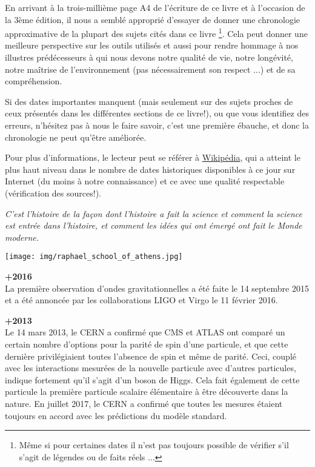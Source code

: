 En arrivant à la trois-millième page A4 de l'écriture de ce livre et à l'occasion de la 3ème édition, il nous a semblé approprié d'essayer de donner une chronologie approximative de la plupart des sujets cités dans ce livre \footnote{Même si pour certaines dates il n'est pas toujours possible de vérifier s'il s'agit de légendes ou de faits réels ...}. Cela peut donner une meilleure perspective sur les outils utilisés et aussi pour rendre hommage à nos illustres prédécesseurs à qui nous devons notre qualité de vie, notre longévité, notre maîtrise de l'environnement (pas nécessairement son respect ...) et de sa compréhension.

Si des dates importantes manquent (mais seulement sur des sujets proches de ceux présentés dans les différentes sections de ce livre!), ou que vous identifiez des erreurs, n'hésitez pas à nous le faire savoir, c'est une première ébauche, et donc la chronologie ne peut qu'être améliorée.

Pour plus d'informations, le lecteur peut se référer à \href{http://www.wikipedia.com}{{\color{blue} Wikipédia}}, qui a atteint le plus haut niveau dans le nombre de dates historiques disponibles à ce jour sur Internet (du moins à notre connaissance) et ce avec une qualité respectable (vérification des sources!).

\begin{center}
\textit{C'est l'histoire de la façon dont l'histoire a fait la science et comment la science est entrée dans l'histoire, et comment les idées qui ont émergé ont fait le Monde moderne.}
\end{center}

\texttt{[image: img/raphael\_school\_of\_athens.jpg]}

\textbf{+2016}\\
La première observation d'ondes gravitationnelles a été faite le 14 septembre 2015 et a été annoncée par les collaborations LIGO et Virgo le 11 février 2016.

\textbf{+2013}\\
Le 14 mars 2013, le CERN a confirmé que CMS et ATLAS ont comparé un certain nombre d'options pour la parité de spin d'une particule, et que cette dernière privilégiaient toutes l'absence de spin et même de parité. Ceci, couplé avec les interactions mesurées de la nouvelle particule avec d'autres particules, indique fortement qu'il s'agit d'un boson de Higgs. Cela fait également de cette particule la première particule scalaire élémentaire à être découverte dans la nature. En juillet 2017, le CERN a confirmé que toutes les mesures étaient toujours en accord avec les prédictions du modèle standard.

